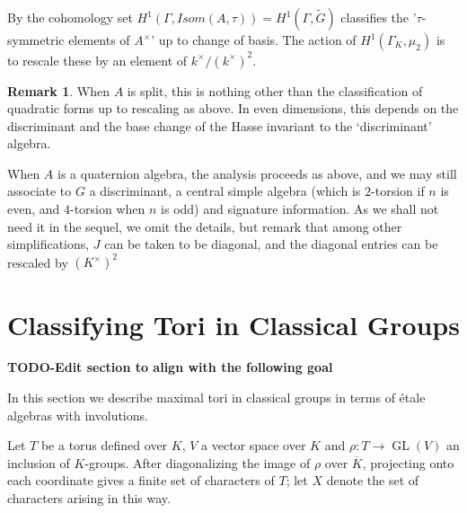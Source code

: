 \documentclass{article}
\theoremstyle{plain}
\theoremstyle{definition}
\newtheorem{remark}[theorem]{Remark}
\numberwithin{equation}{section}
\DeclareMathOperator{\GL}{GL}
\newcommand{\GalKbK}{\Gamma_K}
\newcommand{\Kb}{\overline{K}}
\newcommand{\TODO}[1]{\textbf{TODO-#1}}
\begin{document}
By \cite[29.16]{TODO - The book of involutions}
the cohomology set $H^1(\Gamma, Isom(A,\tau)) = H^1(\Gamma,\tilde{G}) $ classifies the '$\tau$-symmetric elements of $A^\times$' up to change of basis.
The action of $H^1(\GalKbK,\mu_2) $ is to rescale these by an element of $k^\times/(k^\times)^2$.
\begin{remark}
When $A$ is split, this is nothing other than the classification of quadratic forms up to rescaling as above.
In even dimensions, this depends on the discriminant and the base change of the Hasse invariant to the `discriminant' algebra.

When $A$ is a quaternion algebra, the analysis proceeds as above, and we may still associate to $G$ a discriminant, a central simple algebra (which is $2$-torsion if $n$ is even, and $4$-torsion when $n$ is odd) and signature information. 
As we shall not need it in the sequel, we omit the details, but remark that among other simplifications, $J$ can be taken to be diagonal, and the diagonal entries can be rescaled by $(K^\times)^2$
\end{remark}





\section{Classifying Tori in Classical Groups}

\TODO{Edit section to align with the following goal}

In this section we describe maximal tori in classical groups in terms of \'etale algebras with involutions.

Let $T$ be a torus defined over $K$, $V$ a vector space over $K$ and $\rho : T \rightarrow \GL(V)$ an inclusion of $K$-groups.  After diagonalizing the image of $\rho$ over $\Kb$, projecting onto each coordinate gives a finite set of characters of $T$; let $X$ denote the set of characters arising in this way. 
\end{document}
